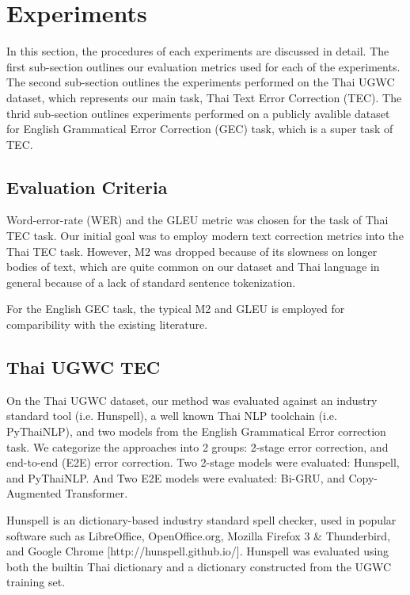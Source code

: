 \section{Experiments}

In this section, the procedures of each experiments are discussed in detail. The first sub-section outlines our evaluation metrics used for each of the experiments. The second sub-section outlines the experiments performed on the Thai UGWC dataset, which represents our main task, Thai Text Error Correction (TEC). The thrid sub-section outlines experiments performed on a publicly avalible dataset for English Grammatical Error Correction (GEC) task, which is a super task of TEC.

\subsection{Evaluation Criteria}

Word-error-rate (WER) and the GLEU metric was chosen for the task of Thai TEC task. Our initial goal was to employ modern text correction metrics into the Thai TEC task. However, M2 was dropped because of its slowness on longer bodies of text, which are quite common on our dataset and Thai language in general because of a lack of standard sentence tokenization.


For the English GEC task, the typical M2 and GLEU is employed for comparibility with the existing literature.

\subsection{Thai UGWC TEC}

On the Thai UGWC dataset, our method was evaluated against an industry standard tool (i.e. Hunspell), a well known Thai NLP toolchain (i.e. PyThaiNLP), and two models from the English Grammatical Error correction task. We categorize the approaches into 2 groups: 2-stage error correction, and end-to-end (E2E) error correction. Two 2-stage models were evaluated: Hunspell, and PyThaiNLP. And Two E2E models were evaluated: Bi-GRU, and Copy-Augmented Transformer.

Hunspell is an dictionary-based industry standard spell checker, used in popular software such as LibreOffice, OpenOffice.org, Mozilla Firefox 3 \& Thunderbird, and Google Chrome [http://hunspell.github.io/]. Hunspell was evaluated using both the builtin Thai dictionary and a dictionary constructed from the UGWC training set. 

